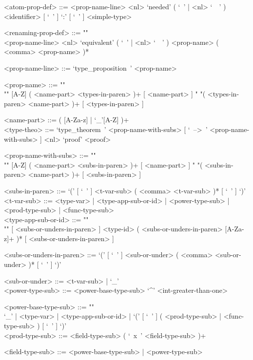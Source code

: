 \documentclass{article}
\begin{document}
\begin{grammar}
<atom-prop-def> ::=
<prop-name-line> <nl> `needed' ( `\ ' | <nl> `\ \ ' )
<identifier> [ `\ ' ] `:' [ `\ ' ] <simple-type>

<renaming-prop-def> ::= ""\\
<prop-name-line> <nl>
`equivalent' ( `\ ' | <nl> `\ \ ' ) <prop-name> ( <comma> <prop-name> )*

<prop-name-line> ::= `type_proposition\ ' <prop-name>

<prop-name> ::=  ""\\""
[A-Z] ( <name-part> <types-in-paren> )+ [ <name-part> ]
\alt " "( <types-in-paren> <name-part> )+ [ <types-in-paren> ]

<name-part> ::= ( [A-Za-z] | `_'[A-Z] )+
\\

\newpage
<type-theo> ::=
`type_theorem\ ' <prop-name-with-subs> [ `\ -->\ ' <prop-name-with-subs> ] <nl>
`proof' <proof>

<prop-name-with-subs> ::=  ""\\""
[A-Z] ( <name-part> <subs-in-paren> )+ [ <name-part> ]
\alt " "( <subs-in-paren> <name-part> )+ [ <subs-in-paren> ]

<subs-in-paren> ::=
`(' [ `\ ' ] <t-var-sub> ( <comma> <t-var-sub> )* [ `\ ' ] `)'
\\

<t-var-sub> ::=
<type-var> | <type-app-sub-or-id> | <power-type-sub> | <prod-type-sub> |
<func-type-sub>
\\

<type-app-sub-or-id> ::= ""\\""
[ <subs-or-unders-in-paren> ]
<type-id> ( <subs-or-unders-in-paren> [A-Za-z]+ )*
[ <subs-or-unders-in-paren> ]

<subs-or-unders-in-paren> ::=
`(' [ `\ ' ] <sub-or-under> ( <comma> <sub-or-under> )* [ `\ ' ] `)'

<sub-or-under> ::= <t-var-sub> | `_'
\\

<power-type-sub> ::= <power-base-type-sub> `^' <int-greater-than-one>

<power-base-type-sub> ::= ""\\
`_' | <type-var> | <type-app-sub-or-id> |
`(' [ `\ ' ] ( <prod-type-sub> | <func-type-sub> ) [ `\ ' ] `)'
\\

<prod-type-sub> ::= <field-type-sub> ( `\ x\ ' <field-type-sub> )+

<field-type-sub> ::= <power-base-type-sub> | <power-type-sub>
\\


\end{grammar}
\end{document}
